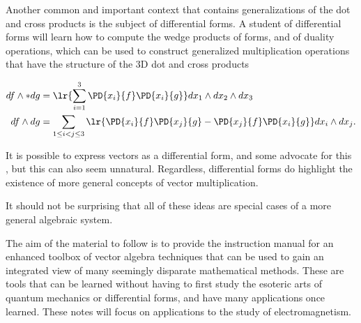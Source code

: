 Another common and important context that contains generalizations of the dot and cross products is the subject of differential forms.
A student of differential forms will learn how to compute the wedge products of forms, and of duality operations, which can be used to construct generalized multiplication operations that have the structure of the 3D dot and cross products

\begin{equation}\label{eqn:GAmotivation:160}
\begin{aligned}
df \wedge * dg &= \lr{ \sum_{i=1}^3 \PD{x_i}{f} \PD{x_i}{g} } dx_1 \wedge dx_2 \wedge dx_3 \\
df \wedge dg &= \sum_{1 \le i < j \le 3} \lr{
\PD{x_i}{f} \PD{x_j}{g}
-\PD{x_j}{f} \PD{x_i}{g}
}
dx_i \wedge dx_j.
\end{aligned}
\end{equation}

It is possible to express vectors as a differential form, and some advocate for this \citep{flanders1989dfa}, but this can also seem unnatural.  Regardless, differential forms do highlight the existence of more general concepts of vector multiplication.  %

It should not be surprising that all of these ideas are special cases of a more general algebraic system.

The aim of the material to follow is to provide the instruction manual for an enhanced toolbox of vector algebra techniques that can be used to gain an integrated view of many seemingly disparate mathematical methods.  These are tools that can be learned without having to first study the esoteric arts of quantum mechanics or differential forms, and have many applications once learned.  These notes will focus on applications to the study of electromagnetism.

